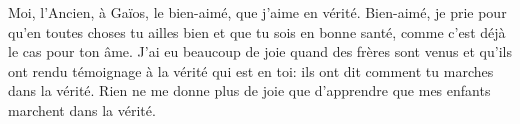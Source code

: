 Moi, l’Ancien, à Gaïos, le bien-aimé, que j’aime en vérité.
Bien-aimé, je prie pour qu’en toutes choses tu ailles bien
	et que tu sois en bonne santé, comme c’est déjà le cas pour ton âme.
J’ai eu beaucoup de joie quand des frères sont venus
	et qu’ils ont rendu témoignage à la vérité qui est en toi:
	ils ont dit comment tu marches dans la vérité.
Rien ne me donne plus de joie
	que d’apprendre que mes enfants marchent dans la vérité.
